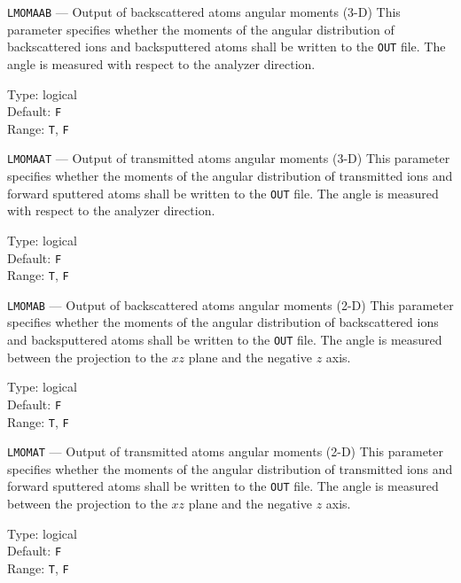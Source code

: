 \begin{keydescription}{\texttt{LMOMAAB} --- Output of backscattered atoms
angular moments (3-D)}
%
  This parameter specifies whether the moments of the angular distribution 
  of backscattered ions and backsputtered atoms shall be written to the
  \texttt{OUT} file. The angle is measured with respect to the analyzer direction.
  \begin{keytab}
    Type:    \> logical \\
    Default: \> \texttt{F} \\
    Range:   \> \texttt{T}, \texttt{F} 
  \end{keytab}
\end{keydescription}

\begin{keydescription}{\texttt{LMOMAAT} --- Output of transmitted atoms angular
moments (3-D)}
%
  This parameter specifies whether the moments of the angular distribution 
  of transmitted ions and forward sputtered atoms shall be written to
  the \texttt{OUT} file. The angle is measured with respect to the analyzer direction.
  \begin{keytab}
    Type:    \> logical \\
    Default: \> \texttt{F} \\
    Range:   \> \texttt{T}, \texttt{F} 
  \end{keytab}
\end{keydescription}

\begin{keydescription}{\texttt{LMOMAB} --- Output of backscattered atoms
angular moments (2-D)}
%
  This parameter specifies whether the moments of the angular distribution 
  of backscattered ions and backsputtered atoms shall be written to the
  \texttt{OUT} file. The angle is measured
  between the projection to the $xz$ plane and the negative $z$ axis.
  \begin{keytab}
    Type:    \> logical \\
    Default: \> \texttt{F} \\
    Range:   \> \texttt{T}, \texttt{F} 
  \end{keytab}
\end{keydescription}

\begin{keydescription}{\texttt{LMOMAT} --- Output of transmitted atoms angular
moments (2-D)}
%
  This parameter specifies whether the moments of the angular distribution 
  of transmitted ions and forward sputtered atoms shall be written to
  the \texttt{OUT} file. The angle is measured
  between the projection to the $xz$ plane and the negative $z$ axis.
  \begin{keytab}
    Type:    \> logical \\
    Default: \> \texttt{F} \\
    Range:   \> \texttt{T}, \texttt{F} 
  \end{keytab}
\end{keydescription}

